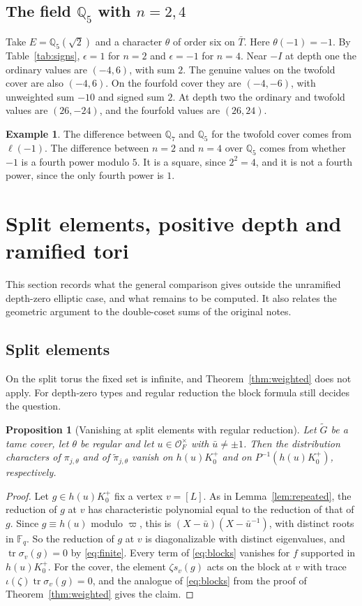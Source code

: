 \documentclass[12pt,letterpaper]{article}
\numberwithin{equation}{section}
\newtheorem{proposition}[theorem]{Proposition}
\theoremstyle{definition}
\newtheorem{example}[theorem]{Example}
\theoremstyle{remark}
\newcommand{\OO}{\mathcal O_F}
\newcommand{\kk}{\mathbb F_q}
\newcommand{\Gt}{\widetilde G}
\newcommand{\tr}{\operatorname{tr}}
\newcommand{\sgn}{\epsilon}
\begin{document}
\subsection*{The field $\mathbb Q_5$ with $n=2,4$}
Take $E=\mathbb Q_5(\sqrt2)$ and a character $\theta$ of order six on $\bar T$. Here $\theta(-1)=-1$. By Table~\ref{tab:signs}, $\sgn=1$ for $n=2$ and $\sgn=-1$ for $n=4$. Near $-I$ at depth one the ordinary values are $(-4,6)$, with sum $2$. The genuine values on the twofold cover are also $(-4,6)$. On the fourfold cover they are $(-4,-6)$, with unweighted sum $-10$ and signed sum $2$. At depth two the ordinary and twofold values are $(26,-24)$, and the fourfold values are $(26,24)$.

\begin{example}
The difference between $\mathbb Q_7$ and $\mathbb Q_5$ for the twofold cover comes from $\ell(-1)$. The difference between $n=2$ and $n=4$ over $\mathbb Q_5$ comes from whether $-1$ is a fourth power modulo $5$. It is a square, since $2^2=4$, and it is not a fourth power, since the only fourth power is $1$.
\end{example}

\section{Split elements, positive depth and ramified tori}\label{sec:extensions}
This section records what the general comparison gives outside the unramified depth-zero elliptic case, and what remains to be computed. It also relates the geometric argument to the double-coset sums of the original notes.

\subsection*{Split elements}
On the split torus the fixed set is infinite, and Theorem~\ref{thm:weighted} does not apply. For depth-zero types and regular reduction the block formula still decides the question.

\begin{proposition}[Vanishing at split elements with regular reduction]\label{prop:splitvanish}
Let $\Gt$ be a tame cover, let $\theta$ be regular and let $u\in\OO^\times$ with $\bar u\ne\pm1$. Then the distribution characters of $\pi_{j,\theta}$ and of $\widetilde\pi_{j,\theta}$ vanish on $h(u)K_0^+$ and on $P^{-1}(h(u)K_0^+)$, respectively.
\end{proposition}
\begin{proof}
Let $g\in h(u)K_0^+$ fix a vertex $v=[L]$. As in Lemma~\ref{lem:repeated}, the reduction of $g$ at $v$ has characteristic polynomial equal to the reduction of that of $g$. Since $g\equiv h(u)$ modulo $\varpi$, this is $(X-\bar u)(X-\bar u^{-1})$, with distinct roots in $\kk$. So the reduction of $g$ at $v$ is diagonalizable with distinct eigenvalues, and $\tr\sigma_v(g)=0$ by \eqref{eq:finite}. Every term of \eqref{eq:blocks} vanishes for $f$ supported in $h(u)K_0^+$. For the cover, the element $\zeta s_v(g)$ acts on the block at $v$ with trace $\iota(\zeta)\tr\sigma_v(g)=0$, and the analogue of \eqref{eq:blocks} from the proof of Theorem~\ref{thm:weighted} gives the claim.
\end{proof}
\end{document}
